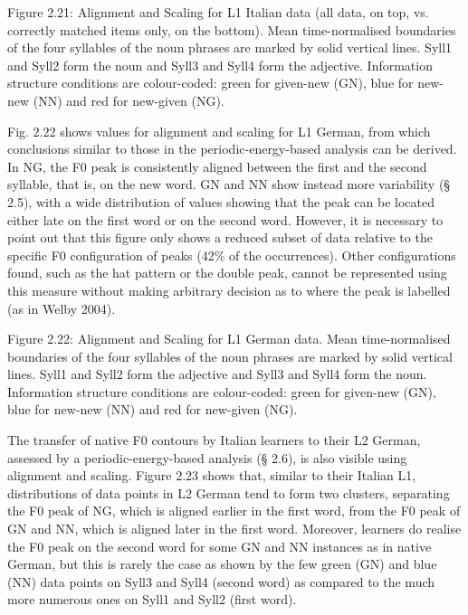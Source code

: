\begin{stylecaption}
Figure 2.21: Alignment and Scaling for L1 Italian data (all data, on top, vs. correctly matched items only, on the bottom). Mean time-normalised boundaries of the four syllables of the noun phrases are marked by solid vertical lines. Syll1 and Syll2 form the noun and Syll3 and Syll4 form the adjective. Information structure conditions are colour-coded: green for given-new (GN), blue for new-new (NN) and red for new-given (NG).
\end{stylecaption}

\begin{styleStandard}
Fig. 2.22 shows values for alignment and scaling for L1 German, from which conclusions similar to those in the periodic-energy-based analysis can be derived. In NG, the F0 peak is consistently aligned between the first and the second syllable, that is, on the new word. GN and NN show instead more variability (§ 2.5), with a wide distribution of values showing that the peak can be located either late on the first word or on the second word. However, it is necessary to point out that this figure only shows a reduced subset of data relative to the specific F0 configuration of peaks (42\% of the occurrences). Other configurations found, such as the hat pattern or the double peak, cannot be represented using this measure without making arbitrary decision as to where the peak is labelled (as in Welby 2004).
\end{styleStandard}

\begin{stylelsBulletList}
  [Warning: Image ignored] %
 
\end{stylelsBulletList}

\begin{stylecaption}
Figure 2.22: Alignment and Scaling for L1 German data. Mean time-normalised boundaries of the four syllables of the noun phrases are marked by solid vertical lines. Syll1 and Syll2 form the adjective and Syll3 and Syll4 form the noun. Information structure conditions are colour-coded: green for given-new (GN), blue for new-new (NN) and red for new-given (NG).
\end{stylecaption}

\begin{styleStandard}
The transfer of native F0 contours by Italian learners to their L2 German, assessed by a periodic-energy-based analysis (§ 2.6), is also visible using alignment and scaling. Figure 2.23 shows that, similar to their Italian L1, distributions of data points in L2 German tend to form two clusters, separating the F0 peak of NG, which is aligned earlier in the first word, from the F0 peak of GN and NN, which is aligned later in the first word. Moreover, learners do realise the F0 peak on the second word for some GN and NN instances as in native German, but this is rarely the case as shown by the few green (GN) and blue (NN) data points on Syll3 and Syll4 (second word) as compared to the much more numerous ones on Syll1 and Syll2 (first word).
\end{styleStandard}

